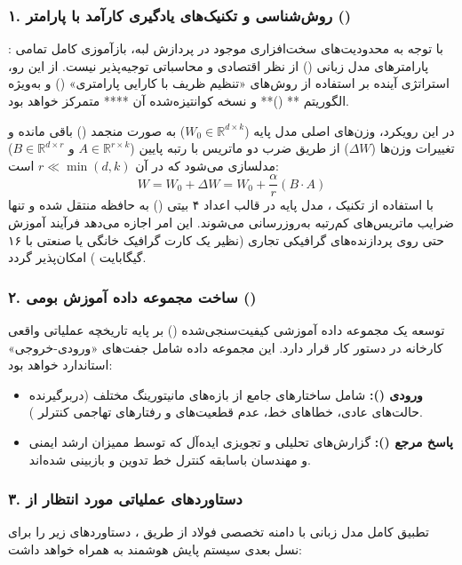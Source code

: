 \documentclass[a4paper, 10pt, twocolumn]{article}
\begin{document}
	\subsubsection{۱. روش‌شناسی و تکنیک‌های یادگیری کارآمد با پارامتر ()}:
	با توجه به محدودیت‌های سخت‌افزاری موجود در پردازش لبه، بازآموزی کامل تمامی پارامترهای مدل زبانی () از نظر اقتصادی و محاسباتی توجیه‌پذیر نیست. از این رو، استراتژی آینده بر استفاده از روش‌های «تنظیم ظریف با کارایی پارامتری» () و به‌ویژه الگوریتم ** ()** و نسخه کوانتیزه‌شده آن ** متمرکز خواهد بود.
	
	در این رویکرد، وزن‌های اصلی مدل پایه ($W_0 \in \mathbb{R}^{d \times k}$) به صورت منجمد () باقی مانده و تغییرات وزن‌ها ($\Delta W$) از طریق ضرب دو ماتریس با رتبه پایین ($A \in \mathbb{R}^{r \times k}$ و $B \in \mathbb{R}^{d \times r}$) مدلسازی می‌شود که در آن $r \ll \min(d, k)$ است:
	\begin{equation}
		W = W_0 + \Delta W = W_0 + \frac{\alpha}{r} (B \cdot A)
	\end{equation}
	با استفاده از تکنیک ، مدل پایه در قالب اعداد ۴ بیتی () به حافظه منتقل شده و تنها ضرایب ماتریس‌های کم‌رتبه  به‌روزرسانی می‌شوند. این امر اجازه می‌دهد فرآیند آموزش حتی روی پردازنده‌های گرافیکی تجاری (نظیر یک کارت گرافیک خانگی یا صنعتی با ۱۶ گیگابایت ) امکان‌پذیر گردد.
	
	\subsubsection{۲. ساخت مجموعه داده آموزش بومی ()}
	توسعه یک مجموعه داده آموزشی کیفیت‌سنجی‌شده () بر پایه تاریخچه عملیاتی واقعی کارخانه در دستور کار قرار دارد. این مجموعه داده شامل جفت‌های «ورودی-خروجی» استاندارد خواهد بود:
	\begin{itemize}
		\item \textbf{ورودی ():} شامل ساختارهای جامع  از بازه‌های مانیتورینگ مختلف (دربرگیرنده حالت‌های عادی، خطاهای خط، عدم قطعیت‌های  و رفتارهای تهاجمی کنترلر ).
		\item \textbf{پاسخ مرجع ():} گزارش‌های تحلیلی و تجویزی ایده‌آل که توسط ممیزان ارشد ایمنی و مهندسان باسابقه کنترل خط تدوین و بازبینی شده‌اند.
	\end{itemize}
	
	\subsubsection{۳. دستاوردهای عملیاتی مورد انتظار از }
	تطبیق کامل مدل زبانی با دامنه تخصصی فولاد از طریق ، دستاوردهای زیر را برای نسل بعدی سیستم پایش هوشمند به همراه خواهد داشت:
	
\end{document}
